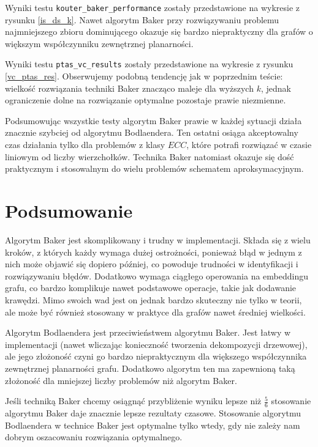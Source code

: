 \documentclass[twoside,a4paper,12pt]{report} %
\theoremstyle{break}
\begin{document}
Wyniki testu \texttt{kouter\_baker\_performance} zostały przedstawione na wykresie z rysunku \ref{is_ds_k}. Nawet algorytm Baker przy rozwiązywaniu problemu najmniejszego zbioru dominującego okazuje się bardzo niepraktyczny dla grafów o większym współczynniku zewnętrznej planarności.


Wyniki testu \texttt{ptas\_vc\_results} zostały przedstawione na wykresie z rysunku \ref{vc_ptas_res}. Obserwujemy podobną tendencję jak w poprzednim teście: wielkość rozwiązania techniki Baker znacząco maleje dla wyższych $k$, jednak ograniczenie dolne na rozwiązanie optymalne pozostaje prawie niezmienne.

Podsumowując wszystkie testy algorytm Baker prawie w każdej sytuacji działa znacznie szybciej od algorytmu Bodlaendera. Ten ostatni osiąga akceptowalny czas działania tylko dla problemów z klasy $ECC$, które potrafi rozwiązać w czasie liniowym od liczby wierzchołków. Technika Baker natomiast okazuje się dość praktycznym i stosowalnym do wielu problemów schematem aproksymacyjnym.

\section{Podsumowanie}
Algorytm Baker jest skomplikowany i trudny w implementacji. Składa się z wielu kroków, z których każdy wymaga dużej ostrożności, ponieważ błąd w jednym z nich może objawić się dopiero później, co powoduje trudności w identyfikacji i rozwiązywaniu błędów. Dodatkowo wymaga ciągłego operowania na embeddingu grafu, co bardzo komplikuje nawet podstawowe operacje, takie jak dodawanie krawędzi. Mimo swoich wad jest on jednak bardzo skuteczny nie tylko w teorii, ale może być również stosowany w praktyce dla grafów nawet średniej wielkości.

Algorytm Bodlaendera jest przeciwieństwem algorytmu Baker. Jest łatwy w implementacji (nawet wliczając konieczność tworzenia dekompozycji drzewowej), ale jego złożoność czyni go bardzo niepraktycznym dla większego współczynnika zewnętrznej planarności grafu. Dodatkowo algorytm ten ma zapewnioną taką złożoność dla mniejszej liczby problemów niż algorytm Baker.

Jeśli techniką Baker chcemy osiągnąć przybliżenie wyniku lepsze niż $\frac{5}{6}$ stosowanie algorytmu Baker daje znacznie lepsze rezultaty czasowe. Stosowanie algorytmu Bodlaendera w technice Baker jest optymalne tylko wtedy, gdy nie zależy nam dobrym oszacowaniu rozwiązania optymalnego. 







\end{document}

